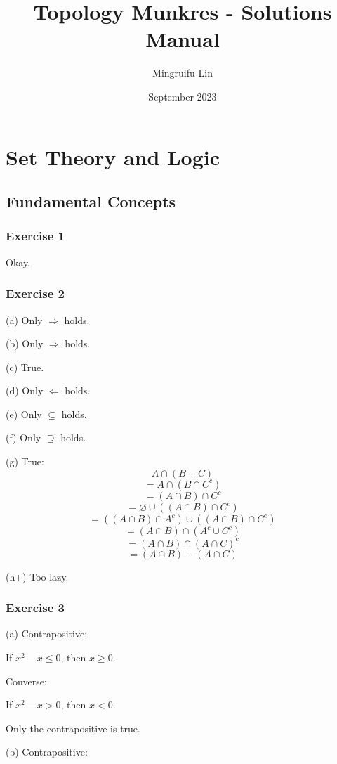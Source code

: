 \documentclass{book}
\title{Topology Munkres - Solutions Manual}
\author{Mingruifu Lin}
\date{September 2023}
\begin{document}
\maketitle

\tableofcontents

\chapter{Set Theory and Logic}

\section{Fundamental Concepts}

\subsection*{Exercise 1}
Okay.

\subsection*{Exercise 2}
(a)
Only $\Rightarrow$ holds.

\noindent
(b)
Only $\Rightarrow$ holds.

\noindent
(c)
True.

\noindent
(d)
Only $\Leftarrow$ holds.

\noindent
(e)
Only $\subseteq$ holds.

\noindent
(f)
Only $\supseteq$ holds.

\noindent
(g)
True:
$$A \cap (B - C)$$
$$= A \cap (B \cap C^c)$$
$$= (A \cap B) \cap C^c$$
$$= \varnothing \cup ((A \cap B) \cap C^c)$$
$$= ((A \cap B) \cap A^c) \cup ((A \cap B) \cap C^c)$$
$$= (A \cap B) \cap (A^c \cup C^c)$$
$$= (A \cap B) \cap (A \cap C)^c$$
$$= (A \cap B) - (A \cap C)$$

\noindent
(h+)
Too lazy.

\subsection*{Exercise 3}
(a)
Contrapositive:

If $x^2 - x \leq 0$, then $x \geq 0$.

\noindent
Converse:

If $x^2 - x > 0$, then $x < 0$.

\noindent
Only the contrapositive is true.

\noindent
(b)
Contrapositive:
\end{document}
